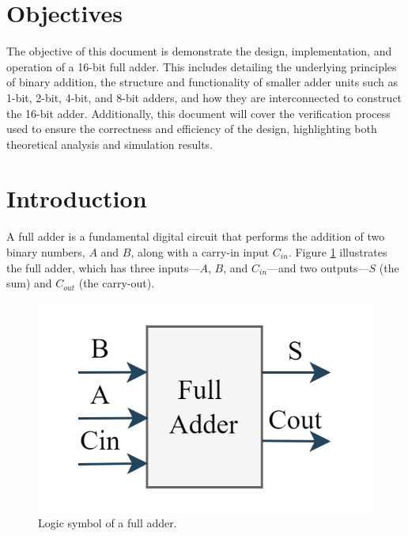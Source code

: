 \documentclass[conference]{IEEEtran}
\begin{document}
	
	\maketitle
	\begin{abstract}
		This document presents the design and verification process of a 16-bit full adder digital circuit. The design and verification were conducted using the SystemVerilog hardware description language, with simulation and compilation performed in Questasim software. Multiple instances of 1-bit, 2-bit, 4-bit, and 8-bit full adders were utilized to implement the 16-bit full adder design. Additionally, a test bench was developed to verify each instance and the final design, demonstrating the successful implementation of the circuit.
	\end{abstract}
	
	\section{Objectives}	
	The objective of this document is demonstrate the design, implementation, and operation of a 16-bit full adder. This includes detailing the underlying principles of binary addition, the structure and functionality of smaller adder units such as 1-bit, 2-bit, 4-bit, and 8-bit adders, and how they are interconnected to construct the 16-bit adder. Additionally, this document will cover the verification process used to ensure the correctness and efficiency of the design, highlighting both theoretical analysis and simulation results.
	\section{Introduction}
	
	A full adder is a fundamental digital circuit that performs the addition of two binary numbers, \( A \) and \( B \), along with a carry-in input \( C_{in} \). Figure \ref{fig:fa1b} illustrates the full adder, which has three inputs—\( A \), \( B \), and \( C_{in} \)—and two outputs—\( S \) (the sum) and \( C_{out} \) (the carry-out).
	
	\begin{figure}[H]
		\centering
		\includegraphics[width=0.6\columnwidth]{FA_1B}
		\caption{Logic symbol of a full adder.}
		\label{fig:fa1b}
	\end{figure}
	
\end{document}
